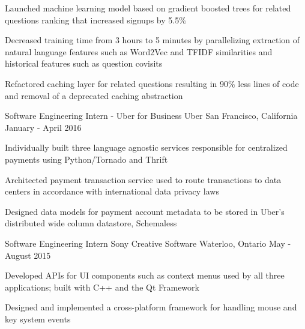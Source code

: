 \begin{cventries}
{\begin{cvitems}
      \item Launched machine learning model based on gradient boosted trees for related questions ranking that increased signups by 5.5\%
      \item Decreased training time from 3 hours to 5 minutes by parallelizing extraction of natural language features such as Word2Vec and TFIDF similarities and historical features such as question covisits
      \item Refactored caching layer for related questions resulting in 90\% less lines of code and removal of a deprecated caching abstraction
      \end{cvitems}
    }
  \cventry
    {Software Engineering Intern - Uber for Business}
    {Uber}
    {San Francisco, California}
    {January - April 2016}
    {
      \begin{cvitems}
      \item Individually built three language agnostic services responsible for centralized payments using Python/Tornado and Thrift
      \item Architected payment transaction service used to route transactions to data centers in accordance with international data privacy laws
      \item Designed data models for payment account metadata to be stored in Uber's distributed wide column datastore, Schemaless
      \end{cvitems}
    }
  \cventry
    {Software Engineering Intern}
    {Sony Creative Software}
    {Waterloo, Ontario}
    {May - August 2015}
    {
      \begin{cvitems}
        \item Developed APIs for UI components such as context menus used by all three applications; built with C++ and the Qt Framework
        \item Designed and implemented a cross-platform framework for handling mouse and key system events
      \end{cvitems}
    }
\end{cventries}

